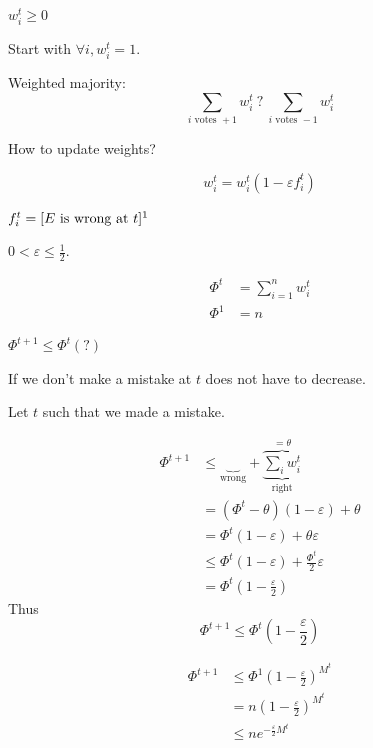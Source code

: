 \FloatBarrier

$w_i^t \geqslant 0$

Start with $\forall i, w_i^t = 1$.

Weighted majority:
\[
    \sum\limits_{i \text{ votes }+1} w_i^t \ ? \ \sum\limits_{i \text{ votes }-1} w_i^t
\]

How to update weights?

\[
    w_i^t = w_i^t(1-\varepsilon f_i^t)
\]

$f_i^t = [E \text{ is wrong at }t]\footnotemark$

$0 < \varepsilon \leqslant \frac{1}{2}$.

\begin{definition}[Potential]
    \[
        \begin{aligned}
            \Phi^t &= \sum\limits_{i=1}^n w_i^t\\
            \Phi^1 &= n
        \end{aligned}
    \]
\end{definition}

$\Phi^{t+1} \leqslant \Phi^t (?)$

If we don't make a mistake at $t$ does not have to decrease.

Let $t$ such that we made a mistake.

\[
    \begin{aligned}
        \Phi^{t+1} &\leqslant \underbrace{\hspace{10pt}}_{\text{wrong}} + \overbrace{\underbrace{\sum\limits_i w_i^t}_{\text{right}}}^{=\theta}\\
        &= \left( \Phi^t -\theta \right) \left( 1-\varepsilon \right) + \theta\\
        &= \Phi^t(1-\varepsilon) + \theta\varepsilon\\
        &\leqslant \Phi^t(1-\varepsilon) + \frac{\Phi^t}{2}\varepsilon\\
        &= \Phi^t \left( 1- \frac{\varepsilon}{2}\right)
    \end{aligned}
\]
Thus
\[
    \Phi^{t+1} \leqslant \Phi^t\left(1-\frac{\varepsilon}{2}\right)
\]

\[
    \begin{aligned}
        \Phi^{t+1} &\leqslant \Phi^1\left( 1-\frac{\varepsilon}{2}\right)^{M^t}\\
        &= n\left( 1-\frac{\varepsilon}{2}\right)^{M^t}\\
        &\leqslant n e^{-\frac{\varepsilon}{2}M^t}
    \end{aligned}
\]

